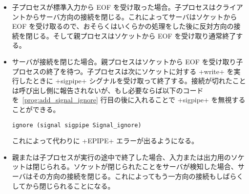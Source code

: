 \begin{itemize}
\item 子プロセスが標準入力から EOF を受け取った場合。子プロセスはクライアントからサーバ方向の接続を閉じる。これによってサーバはソケットから EOF を受け取るので、おそらくはいくらかの処理をした後に反対方向の接続を閉じる。そして親プロセスはソケットから EOF を受け取り通常終了する。
%
\item サーバが接続を閉じた場合。親プロセスはソケットから EOF を受け取り子プロセスの終了を待つ。子プロセスは次にソケットに対する \ml+write+ を実行したときに \ml+sigpipe+ シグナルを受け取って終了する。接続が切れたことは呼び出し側に報告されないが、もし必要ならば以下のコードを~\ref{prog:add_signal_ignore} 行目の後に入れることで \ml+sigpipe+ を無視することができる。
\begin{lstlisting}
ignore (signal sigpipe Signal_ignore)
\end{lstlisting}

\noindent これによって代わりに \ml+EPIPE+ エラーが出るようになる。
%
\item 親または子プロセスが実行の途中で終了した場合、入力または出力用のソケットは閉じられる。ソケットが閉じられたことをサーバが検知した場合、サーバはその方向の接続を閉じる。これによってもう一方向の接続もしばらくしてから閉じられることになる。
\end{itemize}


